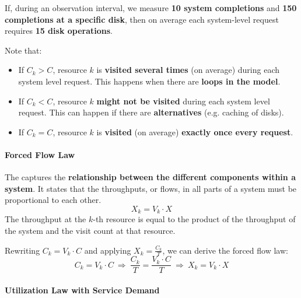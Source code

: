 \begin{examplebox}
	If, during an observation interval, we measure \textbf{10 system completions} and \textbf{150 completions at a specific disk}, then on average each system-level request requires \textbf{15 disk operations}.
\end{examplebox}

\noindent
Note that:
\begin{itemize}
	\item If \underline{$C_{k} > C$}, resource $k$ is \textbf{visited several times} (on average) during each system level request. This happens when there are \textbf{loops in the model}.
	
	\item If \underline{$C_{k} < C$}, resource $k$ \textbf{might not be visited} during each system level request. This can happen if there are \textbf{alternatives} (e.g. caching of disks).
	
	\item If \underline{$C_{k} = C$}, resource $k$ is \textbf{visited} (on average) \textbf{exactly once every request}.
\end{itemize}

\newpage

\paragraph{Forced Flow Law}

The  captures the \textbf{relationship between the different components within a system}. It states that the throughputs, or flows, in all parts of a system must be proportional to each other.
\begin{equation}
	X_{k} = V_{k} \cdot X
\end{equation}
The throughput at the $k$-th resource is equal to the product of the throughput of the system and the visit count at that resource.

\highspace
Rewriting $C_{k} = V_{k} \cdot C$ and applying $X_{k} = \frac{C_{k}}{T}$, we can derive the forced flow law:
\begin{equation*}
	C_{k} = V_{k} \cdot C \: \Rightarrow \: \dfrac{C_{k}}{T} = \dfrac{V_{k} \cdot C}{T} \: \Rightarrow \: X_{k} = V_{k} \cdot X
\end{equation*}

\longline

\paragraph{Utilization Law with Service Demand}

